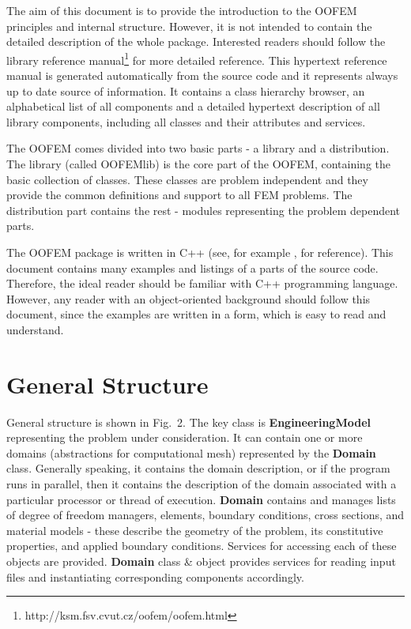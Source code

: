 \documentclass[a4paper]{article}
\newcommand{\class}[1]{{\bf #1}}
\newcommand{\refman}{\oofem library reference manual}
\begin{document}
The aim of this document is to provide the introduction to the OOFEM
principles and internal structure. However, it is not intended to
contain the detailed description of the whole package. Interested readers
should follow the \refman\footnote{http://ksm.fsv.cvut.cz/oofem/oofem.html} for more
detailed reference. This hypertext reference
manual is generated automatically from the source code and it
represents always up to date source of information. It contains a class
hierarchy browser, an alphabetical list of all components and a
detailed hypertext description of all library components, including
all classes and their attributes and services.


The OOFEM comes divided into two basic parts - a library and
a distribution. The library (called OOFEMlib) is the core part of the OOFEM, containing
the basic collection of classes. These classes are problem independent
and they provide the common definitions and support to all FEM
problems. The distribution part contains the rest - modules representing the problem dependent
parts. 

The OOFEM package is written in C++ (see, for example \cite{c++}, for reference). This 
document contains many examples and listings of a parts of the source
code. Therefore, the ideal reader should be familiar with C++ programming
language. However, any reader with an object-oriented background should
follow this document, since the examples are written in a form, which is 
easy to read and understand.

\section{General Structure}

General structure is shown in Fig.~2.
The key class is \class{EngineeringModel} representing the problem
under consideration. It can contain one or more domains (abstractions
for computational mesh) represented by the \class{Domain} class.
Generally
speaking, it contains the domain description, or if the program runs in
parallel, then it contains the description of the domain associated
with a particular processor or thread of execution. \class{Domain} 
contains and manages lists of degree of freedom managers, elements, boundary
conditions, cross sections, and material models - these describe the geometry
of the problem, its constitutive properties, and applied boundary
conditions. Services for accessing each of these objects are
provided. 
\class{Domain} class \& object provides services for reading input
files and instantiating corresponding components accordingly. 
\end{document}
